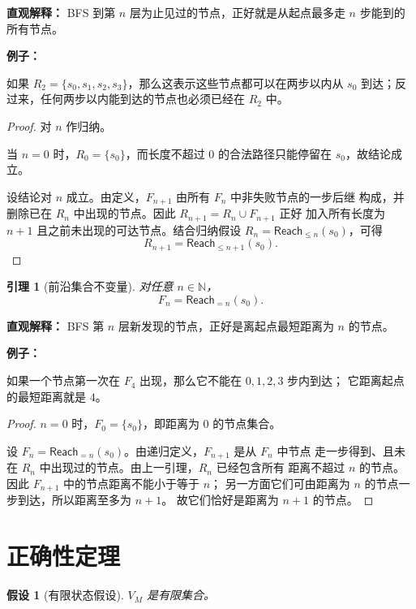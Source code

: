 \documentclass[UTF8]{ctexart}
\theoremstyle{nesylinkblock}
\newtheorem{assumption}{假设}
\newtheorem{lemma}{引理}
\newenvironment{examplebox}
  {\begin{center}\begin{lrbox}{\exampleboxcontent}\begin{minipage}{0.92\linewidth}
   \textbf{例子：}\par\smallskip}
  {\end{minipage}\end{lrbox}\fbox{\usebox{\exampleboxcontent}}\end{center}}
\begin{document}
\noindent\textbf{直观解释：}
BFS 到第 $n$ 层为止见过的节点，正好就是从起点最多走 $n$ 步能到的所有节点。

\begin{examplebox}
如果 $R_2=\{s_0,s_1,s_2,s_3\}$，那么这表示这些节点都可以在两步以内从
$s_0$ 到达；反过来，任何两步以内能到达的节点也必须已经在 $R_2$ 中。
\end{examplebox}

\begin{proof}
对 $n$ 作归纳。

当 $n=0$ 时，$R_0=\{s_0\}$，而长度不超过 $0$ 的合法路径只能停留在
$s_0$，故结论成立。

设结论对 $n$ 成立。由定义，$F_{n+1}$ 由所有 $F_n$ 中非失败节点的一步后继
构成，并删除已在 $R_n$ 中出现的节点。因此 $R_{n+1}=R_n\cup F_{n+1}$ 正好
加入所有长度为 $n+1$ 且之前未出现的可达节点。结合归纳假设
$R_n=\mathsf{Reach}_{\le n}(s_0)$，可得
\[
  R_{n+1}=\mathsf{Reach}_{\le n+1}(s_0).
\]
\end{proof}

\begin{lemma}[前沿集合不变量]
对任意 $n\in\mathbb{N}$，
\[
  F_n=\mathsf{Reach}_{=n}(s_0).
\]
\end{lemma}

\noindent\textbf{直观解释：}
BFS 第 $n$ 层新发现的节点，正好是离起点最短距离为 $n$ 的节点。

\begin{examplebox}
如果一个节点第一次在 $F_4$ 出现，那么它不能在 $0,1,2,3$ 步内到达；
它距离起点的最短距离就是 $4$。
\end{examplebox}

\begin{proof}
$n=0$ 时，$F_0=\{s_0\}$，即距离为 $0$ 的节点集合。

设 $F_n=\mathsf{Reach}_{=n}(s_0)$。由递归定义，$F_{n+1}$ 是从 $F_n$ 中节点
走一步得到、且未在 $R_n$ 中出现过的节点。由上一引理，$R_n$ 已经包含所有
距离不超过 $n$ 的节点。因此 $F_{n+1}$ 中的节点距离不能小于等于 $n$；
另一方面它们可由距离为 $n$ 的节点一步到达，所以距离至多为 $n+1$。
故它们恰好是距离为 $n+1$ 的节点。
\end{proof}

\section{正确性定理}

\begin{assumption}[有限状态假设]
$V_M$ 是有限集合。
\end{assumption}
\end{document}
